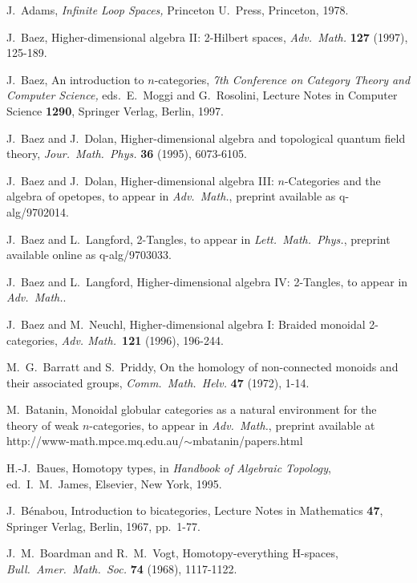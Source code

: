 {\small 

\begin{thebibliography}{10}

 J.\ Adams, {\sl Infinite Loop Spaces,} Princeton
U.\ Press, Princeton, 1978.

 J.\ Baez, Higher-dimensional algebra II: 2-Hilbert spaces,
{\sl Adv.\ Math.} {\bf 127} (1997), 125-189.

 J.\ Baez, An introduction to $n$-categories, {\sl 
7th Conference on Category Theory and Computer Science,} eds.\ 
E.\ Moggi and G.\ Rosolini, Lecture Notes in Computer
Science {\bf 1290}, Springer Verlag, Berlin, 1997.

 J.\ Baez and J.\ Dolan, Higher-dimensional algebra and
topological quantum field theory, {\sl Jour.\ Math.\ Phys. }{\bf 36}
(1995), 6073-6105.

 J.\ Baez and J.\ Dolan, Higher-dimensional algebra III:
$n$-Categories and the algebra of opetopes, to appear in {\sl Adv.\ Math.},
preprint available as q-alg/9702014.

 J.\ Baez and L.\ Langford, 2-Tangles, to appear in  {\sl
Lett.\ Math.\ Phys.}, preprint available online as q-alg/9703033.
 
 J.\ Baez and L.\ Langford, Higher-dimensional algebra
IV: 2-Tangles, to appear in {\sl Adv.\ Math.}.

 J.\ Baez and M.\ Neuchl, Higher-dimensional algebra I:
Braided monoidal 2-categories, {\sl Adv. Math.\ }{\bf 121} (1996),
196-244.

 M.\ G.\ Barratt and S.\ Priddy, On the homology
of non-connected monoids and their associated groups, {\sl Comm.\ 
Math.\ Helv.} {\bf 47} (1972), 1-14.

 M.\ Batanin, Monoidal globular categories as a
natural environment for the theory of weak $n$-categories, to 
appear in {\sl Adv.\ Math.}, preprint available at
http://www-math.mpce.mq.edu.au/$\sim$mbatanin/papers.html

 H.-J.\ Baues, Homotopy types, in {\sl Handbook of
Algebraic Topology}, ed.\ I.\ M.\ James, Elsevier, New York, 1995.

\bibitem{Benabou} J.\ B\'enabou, Introduction to bicategories, Lecture
Notes in Mathematics {\bf 47}, Springer Verlag, Berlin, 1967, pp.\ 1-77.

\bibitem{BV} J.\ M.\ Boardman and R.\ M.\ Vogt, Homotopy-everything
H-spaces, {\sl Bull.\ Amer.\ Math.\ Soc.} {\bf 74} (1968), 1117-1122.


\end{thebibliography}}
